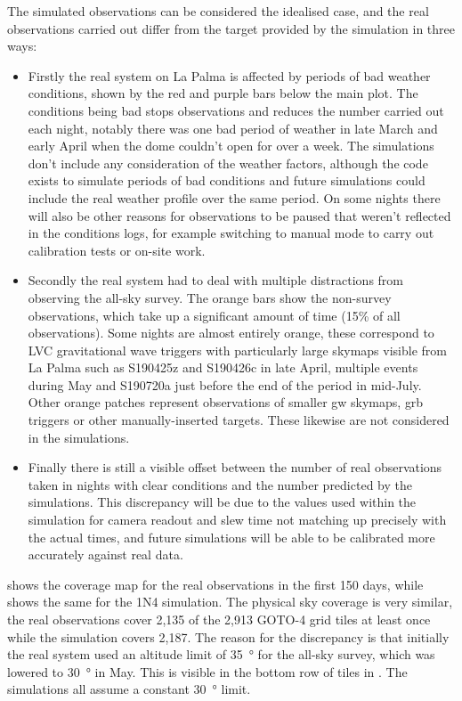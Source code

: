 \begin{colsection}
\begin{colsection}
The simulated observations can be considered the idealised case, and the real observations carried out differ from the target provided by the simulation in three ways:

\begin{itemize}
    \item Firstly the real system on La Palma is affected by periods of bad weather conditions, shown by the red and purple bars below the main plot. The conditions being bad stops observations and reduces the number carried out each night, notably there was one bad period of weather in late March and early April when the dome couldn't open for over a week. The simulations don't include any consideration of the weather factors, although the code exists to simulate periods of bad conditions and future simulations could include the real weather profile over the same period. On some nights there will also be other reasons for observations to be paused that weren't reflected in the conditions logs, for example switching to manual mode to carry out calibration tests or on-site work.

    \item Secondly the real system had to deal with multiple distractions from observing the all-sky survey. The orange bars show the non-survey observations, which take up a significant amount of time (15\% of all observations). Some nights are almost entirely orange, these correspond to LVC gravitational wave triggers with particularly large skymaps visible from La Palma such as S190425z and S190426c in late April, multiple events during May and S190720a just before the end of the period in mid-July. Other orange patches represent observations of smaller \gls{gw} skymaps, \gls{grb} triggers or other manually-inserted targets. These likewise are not considered in the simulations.

    \item Finally there is still a visible offset between the number of real observations taken in nights with clear conditions and the number predicted by the simulations. This discrepancy will be due to the values used within the simulation for camera readout and slew time not matching up precisely with the actual times, and future simulations will be able to be calibrated more accurately against real data.
\end{itemize}

 shows the coverage map for the real observations in the first 150 days, while  shows the same for the 1N4 simulation. The physical sky coverage is very similar, the real observations cover 2,135 of the 2,913 GOTO-4 grid tiles at least once while the simulation covers 2,187. The reason for the discrepancy is that initially the real system used an altitude limit of \SI{35}{\degree} for the all-sky survey, which was lowered to \SI{30}{\degree} in May. This is visible in the bottom row of tiles in . The simulations all assume a constant \SI{30}{\degree} limit.


\end{colsection}
\end{colsection}

